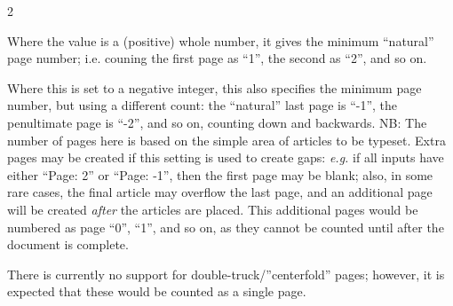 \documentclass[a4paper,DIV=11]{scrartcl}
\begin{document}
\begin{multicols}{2}
{  Where the value is a (positive) whole number, it gives the minimum
  ``natural'' page number; i.e. couning the first page
  as ``1'', the second as ``2'', and so on.

  Where this is set to a negative integer, this also specifies the
  minimum page number, but using a different count: the ``natural''
  last page is ``-1'', the penultimate page is ``-2'', and so on,
  counting down and backwards. NB: The number of pages here is based
  on the simple area of articles to be typeset. Extra pages may be
  created if this setting is used to create gaps: \textit{e.g.} if all inputs
  have either ``Page: 2'' or ``Page: -1'', then the first page may be
  blank; also, in some rare cases, the final article may overflow the
  last page, and an additional page will be created \textit{after} the
  articles are placed. This additional pages would be numbered as page
  ``0'', ``1'', and so on, as they cannot be counted until after the
  document is complete.

  There is currently no support for double-truck/''centerfold'' pages;
  however, it is expected that these would be counted as a single
  page.

}
\end{multicols}
\end{document}
